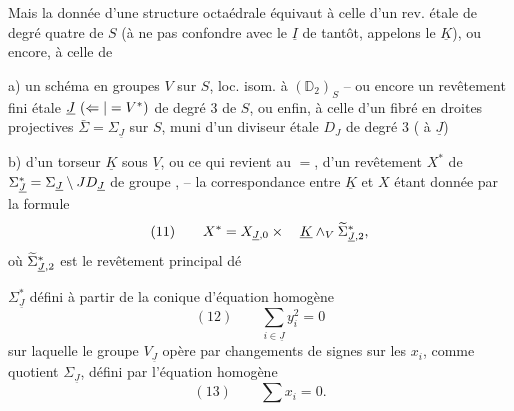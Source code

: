 Mais la donnée d'une structure octaédrale équivaut à celle d'un  rev. étale de degré quatre de $S$ (à ne pas confondre avec le $\underline I$ de tantôt, appelons le $\underline K$), ou encore, à celle de

 a) un schéma en groupes $V$ sur $S$, loc. isom. à $(\mathbb D_2)_S$ -- ou encore un revêtement fini étale $\underline J\ (\Leftarrow|=V^*)$ de degré $3$ de $S$, ou  enfin, à celle d'un  fibré en droites projectives $\bar\Sigma=\Sigma_{\underline J}$ sur $S$, muni d'un diviseur  étale $D_J$ de degré $3$ (  à $\underline J$)

 b) d'un torseur $\underline K$ sous $\underline V$, ou ce qui revient au $=$, d'un revêtement   $X^*$ de $\Sigma^*_{\underline J}=\Sigma_{\underline J}\setminus JD_{\underline J}$ de groupe  ,   -- la correspondance entre $\underline K$ et $X$ étant donnée par la formule
\[
(11)\qquad X^*=X_{\underline J,0}\times\quad \underline K\wedge_V\widetilde\Sigma_{\underline J,2}^*,
\]
où $\widetilde\Sigma_{\underline J,2}^*$ est le revêtement principal dé

$\Sigma^*_{\underline J}$ défini  à partir de la  conique  d'équation homogène
\[
(12)\qquad\sum_{i\in\underline J}y_i^2=0
\]
sur laquelle le groupe $V_{\underline J}$  opère  par changements de signes sur les $x_i$,  comme quotient $\Sigma_{\underline J}$, défini par l'équation homogène
\[
(13)\qquad\sum x_i=0.
\]

